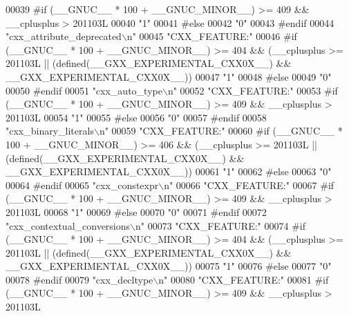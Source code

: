\begin{DoxyCode}
00039 \textcolor{preprocessor}{#if (\_\_GNUC\_\_ * 100 + \_\_GNUC\_MINOR\_\_) >= 409 && \_\_cplusplus > 201103L}
00040 \textcolor{stringliteral}{"1"}
00041 \textcolor{preprocessor}{#else}
00042 \textcolor{stringliteral}{"0"}
00043 \textcolor{preprocessor}{#endif}
00044 \textcolor{stringliteral}{"cxx\_attribute\_deprecated\(\backslash\)n"}
00045 \textcolor{stringliteral}{"CXX\_FEATURE:"}
00046 \textcolor{preprocessor}{#if (\_\_GNUC\_\_ * 100 + \_\_GNUC\_MINOR\_\_) >= 404 && (\_\_cplusplus >= 201103L ||
       (defined(\_\_GXX\_EXPERIMENTAL\_CXX0X\_\_) && \_\_GXX\_EXPERIMENTAL\_CXX0X\_\_))}
00047 \textcolor{stringliteral}{"1"}
00048 \textcolor{preprocessor}{#else}
00049 \textcolor{stringliteral}{"0"}
00050 \textcolor{preprocessor}{#endif}
00051 \textcolor{stringliteral}{"cxx\_auto\_type\(\backslash\)n"}
00052 \textcolor{stringliteral}{"CXX\_FEATURE:"}
00053 \textcolor{preprocessor}{#if (\_\_GNUC\_\_ * 100 + \_\_GNUC\_MINOR\_\_) >= 409 && \_\_cplusplus > 201103L}
00054 \textcolor{stringliteral}{"1"}
00055 \textcolor{preprocessor}{#else}
00056 \textcolor{stringliteral}{"0"}
00057 \textcolor{preprocessor}{#endif}
00058 \textcolor{stringliteral}{"cxx\_binary\_literals\(\backslash\)n"}
00059 \textcolor{stringliteral}{"CXX\_FEATURE:"}
00060 \textcolor{preprocessor}{#if (\_\_GNUC\_\_ * 100 + \_\_GNUC\_MINOR\_\_) >= 406 && (\_\_cplusplus >= 201103L ||
       (defined(\_\_GXX\_EXPERIMENTAL\_CXX0X\_\_) && \_\_GXX\_EXPERIMENTAL\_CXX0X\_\_))}
00061 \textcolor{stringliteral}{"1"}
00062 \textcolor{preprocessor}{#else}
00063 \textcolor{stringliteral}{"0"}
00064 \textcolor{preprocessor}{#endif}
00065 \textcolor{stringliteral}{"cxx\_constexpr\(\backslash\)n"}
00066 \textcolor{stringliteral}{"CXX\_FEATURE:"}
00067 \textcolor{preprocessor}{#if (\_\_GNUC\_\_ * 100 + \_\_GNUC\_MINOR\_\_) >= 409 && \_\_cplusplus > 201103L}
00068 \textcolor{stringliteral}{"1"}
00069 \textcolor{preprocessor}{#else}
00070 \textcolor{stringliteral}{"0"}
00071 \textcolor{preprocessor}{#endif}
00072 \textcolor{stringliteral}{"cxx\_contextual\_conversions\(\backslash\)n"}
00073 \textcolor{stringliteral}{"CXX\_FEATURE:"}
00074 \textcolor{preprocessor}{#if (\_\_GNUC\_\_ * 100 + \_\_GNUC\_MINOR\_\_) >= 404 && (\_\_cplusplus >= 201103L ||
       (defined(\_\_GXX\_EXPERIMENTAL\_CXX0X\_\_) && \_\_GXX\_EXPERIMENTAL\_CXX0X\_\_))}
00075 \textcolor{stringliteral}{"1"}
00076 \textcolor{preprocessor}{#else}
00077 \textcolor{stringliteral}{"0"}
00078 \textcolor{preprocessor}{#endif}
00079 \textcolor{stringliteral}{"cxx\_decltype\(\backslash\)n"}
00080 \textcolor{stringliteral}{"CXX\_FEATURE:"}
00081 \textcolor{preprocessor}{#if (\_\_GNUC\_\_ * 100 + \_\_GNUC\_MINOR\_\_) >= 409 && \_\_cplusplus > 201103L}

\end{DoxyCode}
